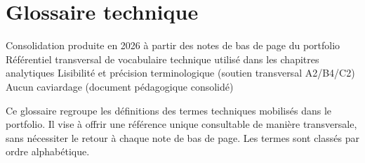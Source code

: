 
\chapter{Glossaire technique}
\label{annex:glossaire}

\annexefiche
  {Consolidation produite en 2026 à partir des notes de bas de page du portfolio}
  {Référentiel transversal de vocabulaire technique utilisé dans les chapitres analytiques}
  {Lisibilité et précision terminologique (soutien transversal A2/B4/C2)}
  {Aucun caviardage (document pédagogique consolidé)}

Ce glossaire regroupe les définitions des termes techniques mobilisés dans le portfolio. Il vise à offrir une référence unique consultable de manière transversale, sans nécessiter le retour à chaque note de bas de page. Les termes sont classés par ordre alphabétique.

\bigskip

